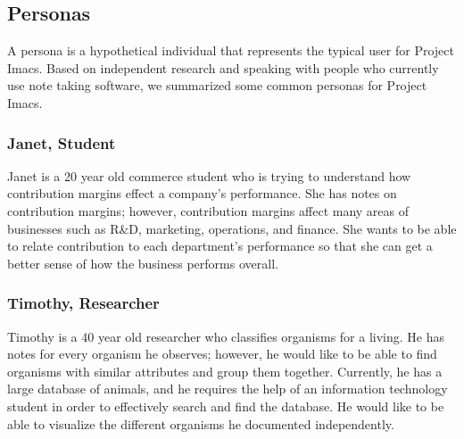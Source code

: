 \documentclass{article}
\begin{document}
\subsection{Personas}
A persona is a hypothetical individual that represents the typical user for Project Imacs. Based on independent research and speaking with people who currently use note taking software, we summarized some common personas for Project Imacs.

\subsubsection{Janet, Student}
Janet is a 20 year old commerce student who is trying to understand how contribution margins effect a company's performance. She has notes on contribution margins; however, contribution margins affect many areas of businesses such as R\&D, marketing, operations, and finance. She wants to be able to relate contribution to each department's performance so that she can get a better sense of how the business performs overall.

\subsubsection{Timothy, Researcher}
Timothy is a 40 year old researcher who classifies organisms for a living. He has notes for every organism he observes; however, he would like to be able to find organisms with similar attributes and group them together. Currently, he has a large database of animals, and he requires the help of an information technology student in order to effectively search and find the database. He would like to be able to visualize the different organisms he documented independently.
\end{document}
